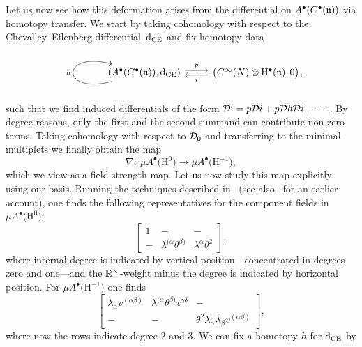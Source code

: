 \documentclass[pdftex]{sigma}
\numberwithin{equation}{section}
\def\bu{\bullet}
\def\d{{\rm d}}
\begin{document}
\begin{eg}
	Let us now see how this deformation arises from the differential on $A^\bullet(C^\bullet(\mathfrak n))$ via homotopy transfer. We start by taking cohomology with respect to the Chevalley--Eilenberg differential~$\d_{\mathrm{CE}}$ and fix homotopy data
	\begin{equation*}
	\begin{tikzcd}
	\arrow[loop left]{l}{h}(A^{\bu} (C^\bu(\fn)) , \d_{\mathrm{CE}})\arrow[r, shift left, "p"] &\big( C^\infty(N) \otimes \mathrm H^\bullet(\fn) ,   0\big) \arrow[l, shift left, "i"]
	\end{tikzcd}\!\!,
	\end{equation*}
	such that we find induced differentials of the form $\mathcal D'= p\mathcal D i + p \mathcal D h \mathcal D i + \cdots$. By degree reasons, only the first and the second summand can contribute non-zero terms. Taking cohomology with respect to $\mathcal D_0$ and transferring to the minimal multiplets we finally obtain the map
	\begin{equation*}
	\nabla \colon \ \mu A^\bullet\big(\mathrm H^0\big) \longrightarrow \mu A^\bullet\big(\mathrm H^{-1}\big) ,
	\end{equation*}
	which we view as a field strength map.
	Let us now study this map explicitly using our basis.
	Running the techniques described in~\cite{perspectives} (see also~\cite{KroLoCS} for an earlier account), one finds the following representatives for the component fields in $\mu A^\bullet\big(\mathrm H^0\big)$:
	\begin{equation*}
	\begin{bmatrix}
	1 & - & -\\
	- & \lambda^{(\alpha} \theta^{\beta)} & \lambda^\alpha \theta^2
	\end{bmatrix},
	\end{equation*}
	where internal degree is indicated by vertical position---concentrated in degrees zero and one---and the $\mathbb R^\times$-weight minus the degree is indicated by horizontal position. For $\mu A^\bu\big(\mathrm H^{-1}\big)$ one finds
	\begin{equation*}
	\begin{bmatrix}
	\lambda_{\alpha} v^{(\alpha \beta)} & \lambda^{(\alpha} \theta^{\beta)} v^{\gamma \delta} & -\\
	- & - & \theta^2 \lambda_{\alpha} \lambda_\beta v^{(\alpha \beta)}
	\end{bmatrix} ,
	\end{equation*}
	where now the rows indicate degree 2 and 3. We can fix a homotopy $h$ for $\d_{\mathrm{CE}}$ by
	\begin{equation*}

\end{equation*}
\end{eg}
\end{document}
